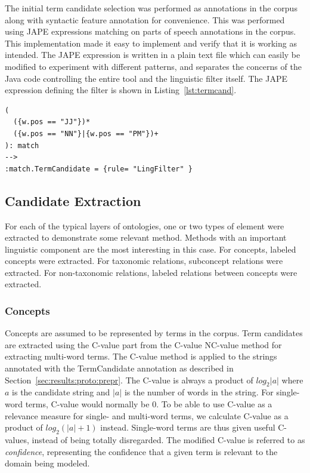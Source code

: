 \documentclass[a4paper]{report}
\begin{document}
The initial term candidate selection was performed as annotations in the corpus along with syntactic feature annotation for convenience.
This was performed using JAPE expressions matching on parts of speech annotations in the corpus.
This implementation made it easy to implement and verify that it is working as intended.
The JAPE expression is written in a plain text file which can easily be modified to experiment with different patterns, and separates the concerns of the Java code controlling the entire tool and the linguistic filter itself.
The JAPE expression defining the filter is shown in Listing~\ref{lst:termcand}.

\begin{Code}
\begin{lstlisting}[frame=single]
(
  ({w.pos == "JJ"})*
  ({w.pos == "NN"}|{w.pos == "PM"})+
): match
-->
:match.TermCandidate = {rule= "LingFilter" }
\end{lstlisting}
\end{Code}

\subsection{Candidate Extraction}

For each of the typical layers of ontologies, one or two types of element were extracted to demonstrate some relevant method.
Methods with an important linguistic component are the most interesting in this case. 
For concepts, labeled concepts were extracted.
For taxonomic relations, subconcept relations were extracted.
For non-taxonomic relations, labeled relations between concepts were extracted.

\subsubsection{Concepts}

Concepts are assumed to be represented by terms in the corpus.
Term candidates are extracted using the C-value part from the C-value NC-value method for extracting multi-word terms.
The C-value method is applied to the strings annotated with the TermCandidate annotation as described in Section~\ref{sec:results:proto:prepr}.
The C-value is always a product of \(log_{2} |a|\) where \(a\) is the candidate string and \(|a|\) is the number of words in the string.
For single-word terms, C-value would normally be \(0\).
To be able to use C-value as a relevance measure for single- and multi-word terms, we calculate C-value as a product of \(log_{2} (|a|+1)\) instead.
Single-word terms are thus given useful C-values, instead of being totally disregarded.
The modified C-value is referred to as \emph{confidence}, representing the confidence that a given term is relevant to the domain being modeled.
\end{document}
